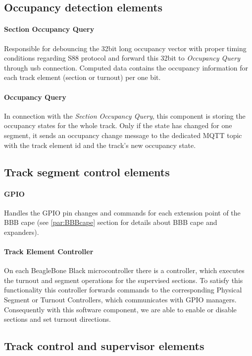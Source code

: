 \subsection{Occupancy detection elements} \label{section:OccupancyDetection}
\paragraph{Section Occupancy Query}
Responsible for debouncing the 32bit long occupancy vector with proper timing conditions regarding S88 protocol and forward this 32bit to \textit{Occupancy Query} through usb connection. Computed data contains the occupancy information for each track element (section or turnout) per one bit.
\paragraph{Occupancy Query}
In connection with the \textit{Section Occupancy Query}, this component is storing the occupancy states for the whole track. Only if the state has changed for one segment, it sends an occupancy change message to the dedicated MQTT topic with the track element id and the track's new occupancy state.

\subsection{Track segment control elements}
\paragraph{GPIO}
Handles the GPIO pin changes and commands for each extension point of the BBB cape (see \ref{par:BBBcape} section for details about BBB cape and expanders).
\paragraph{Track Element Controller}
On each BeagleBone Black microcontroller there is a controller, which executes the turnout and segment operations for the supervised sections. To satisfy this functionality this controller forwards commands to the corresponding Physical Segment or Turnout Controllers, which communicates with GPIO managers. Consequently with this software component, we are able to enable or disable sections and set turnout directions.

\subsection{Track control and supervisor elements}
